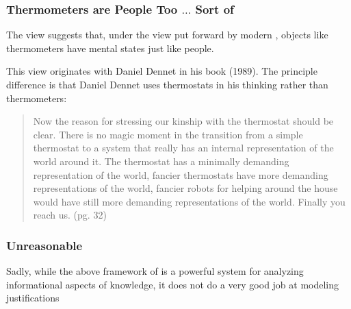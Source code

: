 \begin{frame}[allowframebreaks]
\frametitle{Thermometers are People Too $\ldots$ Sort of}
\begin{itemizedot}
  \item The view suggests that, under the view put forward by modern
  , objects like thermometers have mental states just like
  people.
  
  \item This view originates with Daniel Dennet in his book  (1989).  The principle difference is that Daniel
Dennet uses thermostats in his thinking rather than thermometers:
  
    
\begin{quote}
    Now the reason for stressing our kinship with the thermostat should be
    clear. There is no magic moment in the transition from a simple thermostat
    to a system that really has an internal representation of the world around
    it. The thermostat has a minimally demanding representation of the world,
    fancier thermostats have more demanding representations of the world,
    fancier robots for helping around the house would have still more
    demanding representations of the world. Finally you reach
    us. (pg. 32)
  \end{quote}
\end{itemizedot}
\end{frame}
\begin{frame}
\frametitle{Unreasonable}
\begin{itemizedot}
  \item Sadly, while the above framework of  is a powerful system
  for analyzing informational aspects of knowledge, it does not do a very good
  job at modeling justifications
  
  \item {}
\end{itemizedot}
\end{frame}
